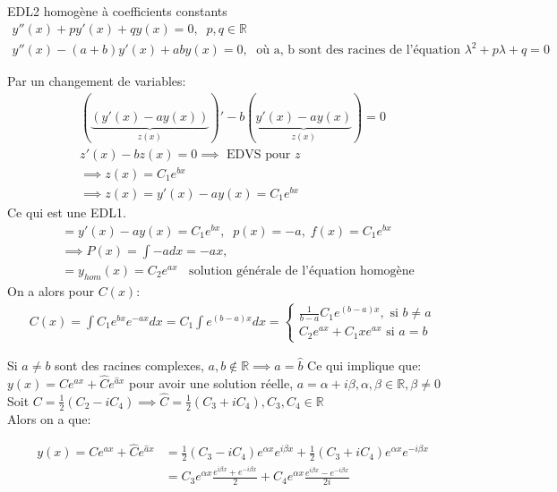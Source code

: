     \begin{parag}{EDL2 homogène à coefficients constants}
        \begin{align*}
            y''(x) + py'(x) + qy(x) = 0, \; \; p, q \in  \mathbb{R} \\
            y''(x) - (a + b)y'(x) + aby(x) = 0, \; \text{ où a, b sont des racines de l'équation } \lambda^2 + p \lambda + q = 0
        \end{align*}
        
        Par un changement de variables:
        \begin{align*}
            ( \underbrace{(y'(x) - ay(x))}_{z(x)})' - b( \underbrace{y'(x) - ay(x)}_{z(x)}) = 0 \\
            z'(x) - bz(x) = 0 \implies \text{ EDVS pour } z \\
            \implies z(x) = C_1 e^{bx} \\
            \implies z(x) = y'(x) - ay(x) = C_1 e^{bx}
        \end{align*}
        Ce qui est une EDL1.
        \begin{align*}
            &=y'(x) - ay(x) = C_1e^{bx}, \; \;  p(x) = -a, \; f(x) = C_1 e^{bx} \\
            &\implies P(x) = \int -adx = -ax, \\
           &=y_{hom}(x) = C_2e^{ax} \; \; \text{ solution générale de l'équation homogène}
        \end{align*}
        On a alors pour $C(x)$:
        \begin{align*}
            C(x) = \int C_1e^{bx} e^{-ax} dx = C_1 \int e^{(b-a)x}dx = \begin{cases} \frac{1}{b-a}C_1 e^{(b-a)x}, \text{ si } b \neq a \\ C_2 e^{ax} + C_1 xe^{ax} \text{ si } a = b \end{cases}
            
        \end{align*}

    
        Si $a \neq b$ sont des racines complexes, $a, b \notin \mathbb{R} \implies a = \hat{b}$
        Ce qui implique que: $y(x) = Ce^{ax} + \hat{C} e^{\hat{a}x}$ pour avoir une solution réelle, $a = \alpha + i \beta , \alpha, \beta \in \mathbb{R}, \beta \neq 0$
        \\        Soit $C = \frac{1}{2}(C_2 - iC_4) \implies \hat{C} = \frac{1}{2} (C_3 + iC_4), C_3, C_4 \in \mathbb{R} $ \\
        Alors on a que:

        \begin{align*}
                  y(x) = Ce^{ax} + \hat{C}e^{\hat{a}x} &= \frac{1}{2}(C_3 -  iC_4)e^{ \alpha x}e^{i \beta x} + \frac{1}{2}(C_3 + iC_4)e^{ \alpha x} e^{-i \beta x}\\
                                                       &= C_3 e^{ \alpha x} \frac{e^{i \beta x } + e^{-i \beta x}}{2} + C_4 e^{ \alpha x} \frac{e^{i \beta x} - e^{- i \beta x}}{2i}
          \end{align*} 
    
    \end{parag}
    
